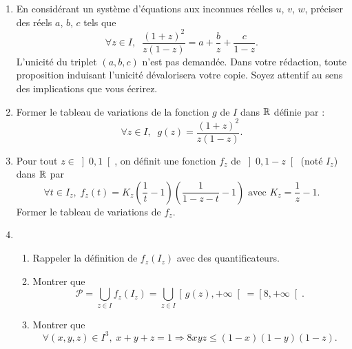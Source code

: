 \begin{enumerate}
 \item En considérant un système d'équations aux inconnues réelles $u$, $v$, $w$, préciser des réels $a$, $b$, $c$ tels que 
\[
 \forall z \in I,\; \;
 \frac{(1+z)^2}{z(1-z)} = a + \frac{b}{z} + \frac{c}{1-z}.
\]
L'unicité du triplet $(a,b,c)$ n'est pas demandée. Dans votre rédaction, toute proposition induisant l'unicité dévalorisera votre copie. Soyez attentif au sens des implications que vous écrirez.
 \item Former le tableau de variations de la fonction $g$ de $I$ dans $\mathbb{R}$ définie par :
\[
 \forall z \in I,\; \; g(z) = \frac{(1+z)^2}{z(1-z)} .
\]
 \item Pour tout $z \in \left] 0,1 \right[$, on définit une fonction $f_z$ de $\left] 0, 1 -z \right[$ (noté $I_z$) dans $\mathbb{R}$ par 
\[
 \forall t \in I_z, \;f_z(t) = K_z\left( \frac{1}{t} - 1\right) \left( \frac{1}{1-z-t} -1\right) \text{ avec } K_z = \frac{1}{z}-1. 
\]
Former le tableau de variations de $f_z$.

 \item
 \begin{enumerate}
  \item Rappeler la définition de $f_z(I_z)$ avec des quantificateurs. 
  \item Montrer que 
\[
 \mathcal{P} = \bigcup_{z \in I}f_z(I_z) = \bigcup_{z \in I}\left[ \,g(z), + \infty\right[ = \left[8,+\infty \right[.
\]
 \item Montrer que 
\[
 \forall (x,y,z)\in I^3,\; x+y+z = 1 \Rightarrow 8xyz \leq (1-x)(1-y)(1-z).
\]
 \end{enumerate}
\end{enumerate}

